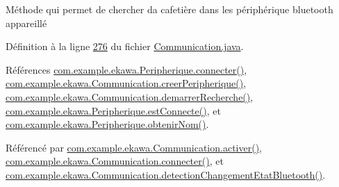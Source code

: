 Méthode qui permet de chercher da cafetière dans les périphérique bluetooth appareillé 



Définition à la ligne \hyperlink{_communication_8java_source_l00276}{276} du fichier \hyperlink{_communication_8java_source}{Communication.\+java}.



Références \hyperlink{_peripherique_8java_source_l00101}{com.\+example.\+ekawa.\+Peripherique.\+connecter()}, \hyperlink{_communication_8java_source_l00365}{com.\+example.\+ekawa.\+Communication.\+creer\+Peripherique()}, \hyperlink{_communication_8java_source_l00350}{com.\+example.\+ekawa.\+Communication.\+demarrer\+Recherche()}, \hyperlink{_peripherique_8java_source_l00234}{com.\+example.\+ekawa.\+Peripherique.\+est\+Connecte()}, et \hyperlink{_peripherique_8java_source_l00244}{com.\+example.\+ekawa.\+Peripherique.\+obtenir\+Nom()}.



Référencé par \hyperlink{_communication_8java_source_l00215}{com.\+example.\+ekawa.\+Communication.\+activer()}, \hyperlink{_communication_8java_source_l00226}{com.\+example.\+ekawa.\+Communication.\+connecter()}, et \hyperlink{_communication_8java_source_l00078}{com.\+example.\+ekawa.\+Communication.\+detection\+Changement\+Etat\+Bluetooth()}.


